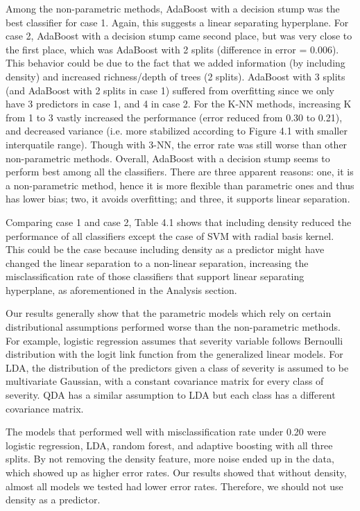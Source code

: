 \documentclass[11pt]{article}
\begin{document}
	Among the non-parametric methods, AdaBoost with a decision stump was the best classifier for case 1. Again, this suggests a linear separating hyperplane. For case 2, AdaBoost with a decision stump came second place, but was very close to the first place, which was AdaBoost with 2 splits (difference in error = 0.006). This behavior could be due to the fact that we added information (by including density) and increased richness/depth of trees (2 splits). AdaBoost with 3 splits (and AdaBoost with 2 splits in case 1) suffered from overfitting since we only have 3 predictors in case 1, and 4 in case 2. For the K-NN methods, increasing K from 1 to 3 vastly increased the performance (error reduced from 0.30 to 0.21), and decreased variance (i.e. more stabilized according to Figure 4.1 with smaller interquatile range).
	Though with 3-NN, the error rate was still worse than other non-parametric methods. Overall, AdaBoost with a decision stump seems to perform best among all the classifiers. There are three apparent reasons: one, it is a non-parametric method, hence it is more flexible than parametric ones and thus has lower bias; two, it avoids overfitting; and three, it supports linear separation.
	
	Comparing case 1 and case 2, Table 4.1 shows that including density reduced the performance of all classifiers except the case of SVM with radial basis kernel. This could be the case because including density as a predictor might have changed the linear separation to a non-linear separation, increasing the
	misclassification rate of those classifiers that support linear separating hyperplane, as aforementioned in the Analysis section.
	
	Our results generally show that the parametric models which rely on certain distributional assumptions performed worse than the non-parametric methods. For example, logistic regression assumes that severity variable follows Bernoulli distribution with the logit link function from the generalized linear models. For LDA, the distribution of the predictors given a class of severity is assumed to be multivariate Gaussian, with a constant covariance matrix for every class of severity. QDA has a similar assumption to LDA but each class has a different covariance matrix.
	
	The models that performed well with misclassification rate under 0.20 were logistic regression, LDA, random forest, and adaptive boosting with all three splits. By not removing the density feature, more noise ended up in the data, which showed up as higher error rates. Our results showed that without density, almost all models we tested had lower error rates. Therefore, we should not use density as a predictor.
	
\end{document}
